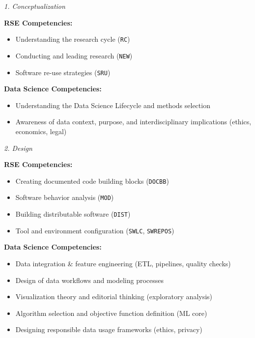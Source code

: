 \documentclass[
        english,biblatex
    ]{lni}
\providecommand{\tightlist}{%
    \setlength{\itemsep}{0pt}\setlength{\parskip}{0pt}}
\begin{document}
    \emph{1. Conceptualization}

    \textbf{RSE Competencies:}

    \begin{itemize}
    \tightlist
    \item
      Understanding the research cycle (\texttt{RC})
    \item
      Conducting and leading research (\texttt{NEW})
    \item
      Software re-use strategies (\texttt{SRU})
    \end{itemize}

    \textbf{Data Science Competencies:}

    \begin{itemize}
    \tightlist
    \item
      Understanding the Data Science Lifecycle and methods selection
    \item
      Awareness of data context, purpose, and interdisciplinary
      implications (ethics, economics, legal)
    \end{itemize}

    \emph{2. Design}

    \textbf{RSE Competencies:}

    \begin{itemize}
    \tightlist
    \item
      Creating documented code building blocks (\texttt{DOCBB})
    \item
      Software behavior analysis (\texttt{MOD})
    \item
      Building distributable software (\texttt{DIST})
    \item
      Tool and environment configuration (\texttt{SWLC},
      \texttt{SWREPOS})
    \end{itemize}

    \textbf{Data Science Competencies:}

    \begin{itemize}
    \tightlist
    \item
      Data integration \& feature engineering (ETL, pipelines, quality
      checks)
    \item
      Design of data workflows and modeling processes
    \item
      Visualization theory and editorial thinking (exploratory analysis)
    \item
      Algorithm selection and objective function definition (ML core)
    \item
      Designing responsible data usage frameworks (ethics, privacy)
    \end{itemize}
\end{document}
